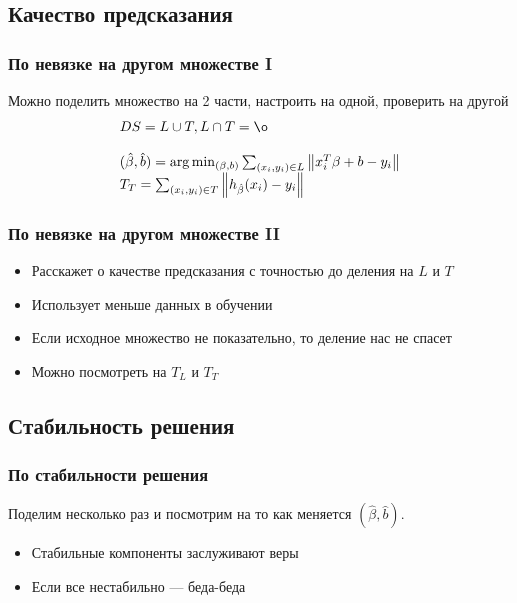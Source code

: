 \documentclass[14pt, fleqn, xcolor={dvipsnames, table}, hyperref={unicode}, babel={english,russian}, inputenc=utf8x]{beamer}
\begin{document}
\subsection{Качество предсказания}

\begin{frame}[t]\frametitle{По невязке на другом множестве I}
Можно поделить множество на 2 части, настроить на одной, проверить на другой
$$
  \begin{array}{ll}
    DS = L \cup T, L \cap T = \o \\
    \\
    (\hat{\beta},\hat{b}) = \arg\min_{(\beta,b)} \sum_{(x_i,y_i) \in L} \left\| x_i^T\beta + b - y_i \right\| \\
    T_T = \sum_{(x_i,y_i) \in T} \left\| h_{\hat{\beta}}(x_i) - y_i \right\|
  \end{array}
$$
\end{frame}

\begin{frame}[t]\frametitle{По невязке на другом множестве II}
\begin{itemize}
  \item Расскажет о качестве предсказания с точностью до деления на $L$ и $T$
  \item Использует меньше данных в обучении
  \item Если исходное множество не показательно, то деление нас не спасет
  \item Можно посмотреть на $T_L$ и $T_T$
\end{itemize}
\end{frame}

\subsection{Стабильность решения}

\begin{frame}[t]\frametitle{По стабильности решения}
Поделим несколько раз и посмотрим на то как меняется $(\hat{\beta},\hat{b})$.
\begin{itemize}
  \item Стабильные компоненты заслуживают веры
  \item Если все нестабильно --- беда-беда
\end{itemize}
\end{frame}
\end{document}

